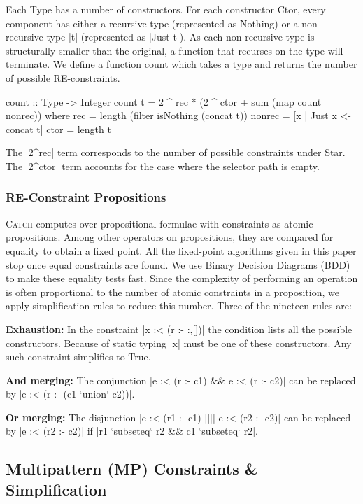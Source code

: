 \documentclass[preprint]{sigplanconf}
\newcommand{\C}[1]{\textsf{#1}}
\newcommand{\catch}{\textsc{Catch}}
\newcommand{\para}[1]{\vspace{2mm}\noindent\textbf{#1}}
\begin{document}
Each \C{Type} has a number of constructors. For each constructor \C{Ctor}, every component has either a recursive type (represented as \C{Nothing}) or a non-recursive type |t| (represented as |Just t|). As each non-recursive type is structurally smaller than the original, a function that recurses on the type will terminate. We define a function \C{count} which takes a type and returns the number of possible RE-constraints.

\begin{code}
count :: Type -> Integer
count t = 2 ^ rec * (2 ^ ctor + sum (map count nonrec))
    where
    rec = length (filter isNothing (concat t))
    nonrec = [x | Just x <- concat t]
    ctor = length t
\end{code}

The |2^rec| term corresponds to the number of possible constraints under \C{Star}. The |2^ctor| term accounts for the case where the selector path is empty.


\subsubsection{RE-Constraint Propositions}
\label{sec:re-propositions}

\catch{} computes over propositional formulae with constraints as atomic propositions. Among other operators on propositions, they are compared for equality to obtain a fixed point. All the fixed-point algorithms given in this paper stop once equal constraints are found. We use Binary Decision Diagrams (BDD) \citep{lee:bdd} to make these equality tests fast. Since the complexity of performing an operation is often proportional to the number of atomic constraints in a proposition, we apply simplification rules to reduce this number. Three of the nineteen rules are:

\para{Exhaustion:} In the constraint |x :< (r :- {:,[]})| the condition lists all the possible constructors. Because of static typing |x| must be one of these constructors. Any such constraint simplifies to True.

\para{And merging:} The conjunction |e :< (r :- c1) && e :< (r :- c2)| can be replaced by |e :< (r :- (c1 `union` c2))|.

\para{Or merging:} The disjunction |e :< (r1 :- c1) |||| e :< (r2 :- c2)| can be replaced by |e :< (r2 :- c2)| if |r1 `subseteq` r2 && c1 `subseteq` r2|.


\subsection{Multipattern (MP) Constraints \& Simplification}
\label{sec:multipattern}
\end{document}
